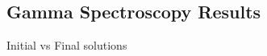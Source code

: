 \documentclass{beamer}
\begin{document}
\subsection{Gamma Spectroscopy Results}
\begin{frame}{Initial vs Final solutions}
  \vspace{-0.6cm}
\end{frame}
\end{document}
